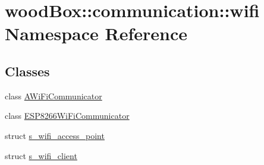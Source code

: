 \hypertarget{namespacewood_box_1_1communication_1_1wifi}{}\section{wood\+Box\+:\+:communication\+:\+:wifi Namespace Reference}
\label{namespacewood_box_1_1communication_1_1wifi}
\subsection*{Classes}
\begin{DoxyCompactItemize}
\item 
class \mbox{\hyperlink{classwood_box_1_1communication_1_1wifi_1_1_a_wi_fi_communicator}{A\+Wi\+Fi\+Communicator}}
\item 
class \mbox{\hyperlink{classwood_box_1_1communication_1_1wifi_1_1_e_s_p8266_wi_fi_communicator}{E\+S\+P8266\+Wi\+Fi\+Communicator}}
\item 
struct \mbox{\hyperlink{structwood_box_1_1communication_1_1wifi_1_1s__wifi__access__point}{s\+\_\+wifi\+\_\+access\+\_\+point}}
\item 
struct \mbox{\hyperlink{structwood_box_1_1communication_1_1wifi_1_1s__wifi__client}{s\+\_\+wifi\+\_\+client}}
\end{DoxyCompactItemize}
